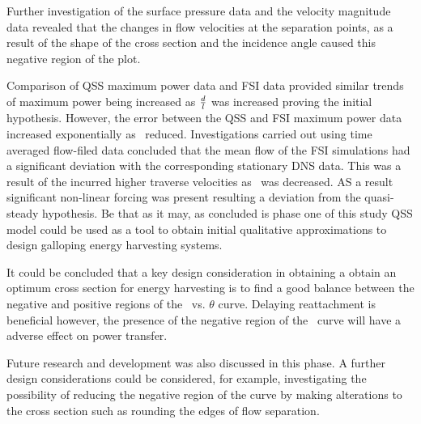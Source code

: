 Further investigation of the surface pressure data and the velocity magnitude data revealed that the changes in flow velocities at the separation points, as a result of the shape of the cross section and the incidence angle caused this negative region of the \cy plot. 

Comparison of QSS maximum power data and FSI data provided similar trends of maximum power being increased as $\frac{d}{l}$ was increased proving the initial hypothesis. However, the error between the QSS and FSI maximum power data increased exponentially as \ratio\ reduced. Investigations carried out using time averaged flow-filed data concluded that the mean flow of the FSI simulations had a significant deviation with the corresponding stationary DNS data. This was a result of the incurred higher  traverse velocities as \ratio\ was decreased. AS a result significant non-linear forcing was present resulting a deviation from the quasi-steady hypothesis. Be that as it may, as concluded is phase one of this study QSS model could be used as a tool to obtain initial qualitative approximations to design galloping energy harvesting systems. 

It could be concluded that a key design consideration in obtaining a obtain an optimum cross section for energy harvesting is to find a good balance between the negative and positive regions of the \cy\ vs. $\theta$ curve. Delaying reattachment is beneficial however, the presence of the negative region of the \cy\ curve will have a adverse effect on power transfer. 

Future research and development was also discussed in this phase. A further design considerations could be considered, for example, investigating the possibility of reducing the negative region of the \cy curve by making alterations to the cross section such as rounding the edges of flow separation.





  

